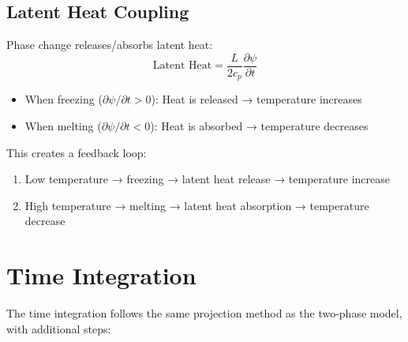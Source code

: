 \documentclass[12pt]{article}
\begin{document}
\subsection{Latent Heat Coupling}

Phase change releases/absorbs latent heat:
\begin{equation}
\text{Latent Heat} = \frac{L}{2c_p} \frac{\partial \psi}{\partial t}
\label{eq:latent_heat}
\end{equation}

\begin{itemize}
    \item When freezing ($\partial \psi / \partial t > 0$): Heat is released → temperature increases
    \item When melting ($\partial \psi / \partial t < 0$): Heat is absorbed → temperature decreases
\end{itemize}

This creates a feedback loop:
\begin{enumerate}
    \item Low temperature → freezing → latent heat release → temperature increase
    \item High temperature → melting → latent heat absorption → temperature decrease
\end{enumerate}

\section{Time Integration}

The time integration follows the same projection method as the two-phase model, with additional steps:
\end{document}
